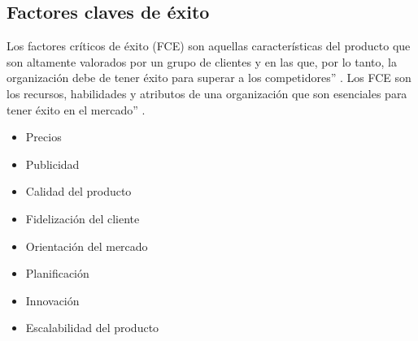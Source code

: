 \subsection{Factores claves de éxito}
Los factores críticos de éxito (FCE) son aquellas características del producto que son altamente valorados por un grupo de clientes y en las que, por lo tanto, la organización debe de tener éxito para superar a los competidores” \cite{castro}. Los FCE son los recursos, habilidades y atributos de una organización que son esenciales para tener éxito en el mercado” \cite{fernando_naranjo_2015}.

\begin{itemize}
    \item Precios
    \item Publicidad
    \item Calidad del producto
    \item Fidelización del cliente
    \item Orientación del mercado
    \item Planificación
    \item Innovación
    \item Escalabilidad del producto
\end{itemize}